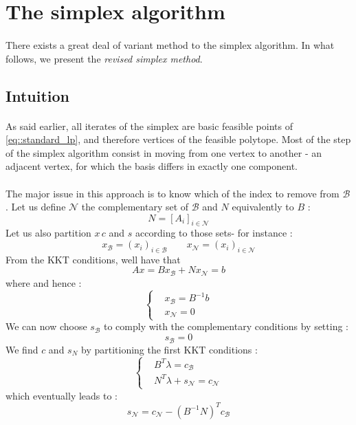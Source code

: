 \documentclass[a4paper]{article}
\newcommand\reflp{\eqref{eq::standard_lp}}
\begin{document}
	\section{The simplex algorithm}
	{
		\paragraph{} There exists a great deal of variant method to the simplex algorithm. In what follows, we present the \emph{revised simplex method}. 
		\subsection{Intuition}
		{
			\paragraph{} As said earlier, all iterates of the simplex are basic feasible points of \reflp, and therefore vertices of the feasible polytope. Most of the step of the simplex algorithm consist in moving from one vertex to another - an adjacent vertex, for which the basis differs in exactly one component. 
			
			\paragraph{} The major issue in this approach is to know which of the index to remove from $\mathcal{B}$. Let us define $\mathcal{N}$ the complementary set of $\mathcal{B}$ and $N$ equivalently to $B$ : 
			$$
				N = [A_i]_{i\in\mathcal{N}}	
			$$
			Let us also partition $x\, c$ and $s$ according to those sets- for instance : 
			$$
				x_\mathcal{B} = (x_i)_{i\in\mathcal{B}}\qquad x_\mathcal{N} = (x_i)_{i\in\mathcal{N}}
			$$
			From the KKT conditions, well have that 
			\begin{equation}
				Ax = Bx_\mathcal{B} + Nx_\mathcal{N} = b
			\end{equation}
			where and hence : 
			\begin{equation}
				\left\{
				\begin{aligned}
					&x_\mathcal{B} = B^{-1}b\\	
					&x_\mathcal{N} = 0
				\end{aligned}\right.
			\end{equation}
			We can now choose $s_\mathcal{B}$ to comply with the complementary conditions by setting : 
			\begin{equation}
				s_\mathcal{B} = 0
			\end{equation}
			We find $c$ and $s_N$ by partitioning the first KKT conditions : 
			\begin{equation}
				\left\{
					\begin{aligned}
						&B^T\lambda = c_\mathcal{B} \\
						&N^T\lambda + s_\mathcal{N} = c_\mathcal{N}
					\end{aligned}
				\right.
			\end{equation}
			which eventually leads to : 
			\begin{equation}
				s_\mathcal{N} = c_\mathcal{N} - (B^{-1}N)^Tc_\mathcal{B}
				\label{eq::sn}
			\end{equation}	
			
}}
\end{document}
